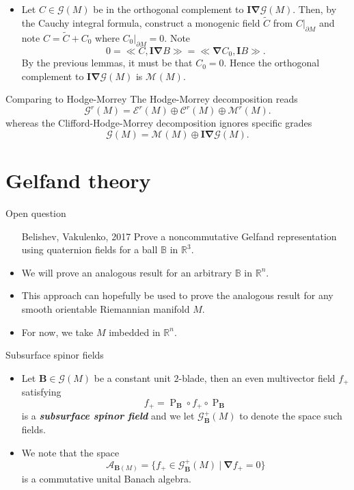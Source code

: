\documentclass[aspectratio=169,handout]{beamer}
\newcommand\boldgreen[1]{\textcolor{lighter_csu_green}{\emph{\textbf{#1}}}}
\newcommand{\R}{\mathbb{R}}
\newcommand{\algebra}{\mathcal{A}}
\newcommand{\grad}{\boldsymbol{\nabla}}
\newcommand{\G}{\mathcal{G}}
\newcommand{\ball}{\mathbb{B}}
\newcommand{\projection}{\operatorname{P}}
\newcommand{\blade}[1]{\boldsymbol{#1}}
\newcommand{\multivecinnerproduct}[2]{\ll #1, #2\gg}
\newcommand{\boundary}{{\partial M}}
\newcommand{\pseudoscalar}{\blade{I}}
\newcommand{\monogenicfields}[1]{\mathcal{M}^{#1}(M)}
\newcommand{\bivector}{\blade{B}}
\begin{document}
\begin{frame}{}
\vfill
\begin{itemize}
\item Let $C\in \G(M)$ be in the orthogonal complement to $\pseudoscalar \grad \G(M)$. Then, by the Cauchy integral formula, construct a monogenic field $\tilde{C}$ from $C\vert_\boundary$ and note $C=\tilde{C}+C_0$ where $C_0\vert_\boundary = 0$. Note
\[
0 = \multivecinnerproduct{C}{\pseudoscalar \grad B} = \multivecinnerproduct{\grad C_0}{\pseudoscalar B}.
\]
By the previous lemmas, it must be that $C_0=0$. Hence the orthogonal complement to $\pseudoscalar \grad \G(M)$ is $\monogenicfields{}$.
\end{itemize}
\vfill
\end{frame}

\begin{frame}{Comparing to Hodge-Morrey}
\vfill
The Hodge-Morrey decomposition reads
\[
\G^r(M) = \mathcal{E}^r(M) \oplus \mathcal{C}^r(M) \oplus \mathcal{M}^r(M).
\]
whereas the Clifford-Hodge-Morrey decomposition ignores specific grades
\[
\G(M) = \monogenicfields{} \oplus \pseudoscalar \grad \G(M).
\]
\vfill
\end{frame}

\section{Gelfand theory}

\begin{frame}{Open question}
\vfill
\begin{itemize}
    \item [Belishev, Vakulenko, 2017] Prove a noncommutative Gelfand representation using quaternion fields for a ball $\ball$ in $\R^3$. 
    \item We will prove an analogous result for an arbitrary $\ball$ in $\R^n$.
    \item This approach can hopefully be used to prove the analogous result for any smooth orientable Riemannian manifold $M$.
    \item For now, we take $M$ imbedded in $\R^n$.
\end{itemize}
\vfill
\end{frame}

\begin{frame}{Subsurface spinor fields}
\vfill
\begin{itemize}
\item Let $\bivector \in \G(M)$ be a constant unit $2$-blade, then an even multivector field $f_+$ satisfying
\[
f_+ = \projection_{\bivector} \circ f_+ \circ \projection_{\bivector}
\]
is a \boldgreen{subsurface spinor field} and we let $\G_{\bivector}^+(M)$ to denote the space such fields.

\item We note that the space 
\[
\algebra_{\bivector(M)} = \{ f_+ \in \G_{\bivector}^+(M) ~\vert~ \grad f_+ = 0 \}
\]
is a commutative unital Banach algebra.
\end{itemize}
\vfill
\end{frame}
\end{document}
